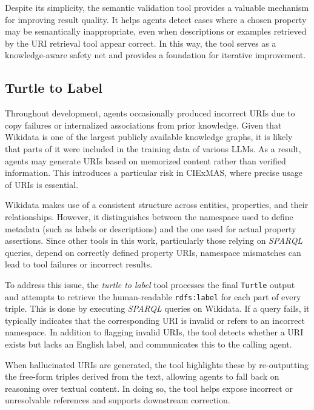 \documentclass[a4paper,oneside,bibliography=totoc]{scrbook}
\begin{document}
Despite its simplicity, the semantic validation tool provides a valuable mechanism for improving result quality. It helps agents detect cases where a chosen property may be semantically inappropriate, even when descriptions or examples retrieved by the URI retrieval tool appear correct. In this way, the tool serves as a knowledge-aware safety net and provides a foundation for iterative improvement.


\subsection{Turtle to Label}
\label{subsec:turtle_to_label}

Throughout development, agents occasionally produced incorrect URIs due to copy failures or internalized associations from prior knowledge. Given that Wikidata is one of the largest publicly available knowledge graphs, it is likely that parts of it were included in the training data of various \acp{LLM}. As a result, agents may generate URIs based on memorized content rather than verified information. This introduces a particular risk in CIExMAS, where precise usage of \acp{URI} is essential.

Wikidata makes use of a consistent structure across entities, properties, and their relationships. However, it distinguishes between the namespace used to define metadata (such as labels or descriptions) and the one used for actual property assertions. Since other tools in this work, particularly those relying on \textit{SPARQL} queries, depend on correctly defined property URIs, namespace mismatches can lead to tool failures or incorrect results.

To address this issue, the \textit{turtle to label} tool processes the final \texttt{Turtle} output and attempts to retrieve the human-readable \texttt{rdfs:label} for each part of every triple. This is done by executing \textit{SPARQL} queries on Wikidata. If a query fails, it typically indicates that the corresponding URI is invalid or refers to an incorrect namespace. In addition to flagging invalid URIs, the tool detects whether a URI exists but lacks an English label, and communicates this to the calling agent.

When hallucinated URIs are generated, the tool highlights these by re-outputting the free-form triples derived from the text, allowing agents to fall back on reasoning over textual content. In doing so, the tool helps expose incorrect or unresolvable references and supports downstream correction.
\end{document}
